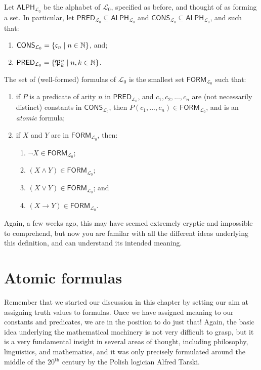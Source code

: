 \begin{defn}
Let $\mathsf{ALPH}_{\mathcal{L}_0}$ be the alphabet of $\mathcal{L}_0$, specified as before, and thought of as forming a set. In particular, let $\mathsf{PRED}_{\mathcal{L}_0} \subseteq \mathsf{ALPH}_{\mathcal{L}_0}$ and $\mathsf{CONS}_{\mathcal{L}_0} \subseteq \mathsf{ALPH}_{\mathcal{L}_0}$, and such that:

\begin{enumerate}
	\item $\mathsf{CONS}_{\mathcal{L}_0}=\{\mathfrak{c}_{n} \mid n \in \mathbb{N}\}$, and;
	\item $\mathsf{PRED}_{\mathcal{L}_0}=\{\mathfrak{P}^{n}_{k} \mid n, k \in \mathbb{N}\}$.
\end{enumerate}

The set of (well-formed) formulas of $\mathcal{L}_0$ is the smallest set $\mathsf{FORM}_{\mathcal{L}_0}$ such that:
%
\begin{enumerate}
	\item if $P$ is a predicate of arity $n$ in $\mathsf{PRED}_{\mathcal{L}_0}$, and $c_1, c_2, ..., c_n$ are (not necessarily distinct) constants in $\mathsf{CONS}_{\mathcal{L}_0}$, then $P(c_1, ..., c_n) \in \mathsf{FORM}_{\mathcal{L}_0}$, and is an \textit{atomic} formula;
	\item if $X$ and $Y$ are in $\mathsf{FORM}_{\mathcal{L}_0}$, then:
		\begin{enumerate}
		\item $\neg X \in \mathsf{FORM}_{\mathcal{L}_0}$;
		\item $(X \wedge Y) \in \mathsf{FORM}_{\mathcal{L}_0}$;
		\item $(X \vee Y) \in \mathsf{FORM}_{\mathcal{L}_0}$; and
		\item $(X \rightarrow Y) \in \mathsf{FORM}_{\mathcal{L}_0}$.
		\end{enumerate}
\end{enumerate}
\end{defn}

Again, a few weeks ago, this may have seemed extremely cryptic and impossible to comprehend, but now you are familar with all the different ideas underlying this definition, and can understand its intended meaning. 

\section{Atomic formulas}

Remember that we started our discussion in this chapter by setting our aim at assigning truth values to formulas. Once we have assigned meaning to our constants and predicates, we are in the position to do just that! Again, the basic idea underlying the mathematical machinery is not very difficult to grasp, but it is a very fundamental insight in several areas of thought, including philosophy, linguistics, and mathematics, and it was only precisely formulated around the middle of the 20$^\text{th}$ century by the Polish logician Alfred Tarski.

